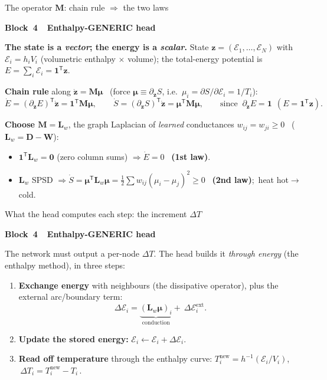 \documentclass[aspectratio=169,11pt]{beamer}
\newcommand{\T}{\mathsf{T}}
\newcommand{\Lw}{\bm{L}_{\!w}}
\newcommand{\bmu}{\bm{\mu}}
\newcommand{\blocktag}[3]{\par\vspace{-3.5mm}\hfill
  {\footnotesize\setlength{\fboxsep}{2.2pt}%
   \colorbox{#1!16}{\textcolor{#1!60!black}{\textbf{Block~#2~\textbullet~#3}}}}%
  \par\vspace{0.3mm}}
\begin{document}
\begin{frame}{The operator $\bm M$: chain rule $\Rightarrow$ the two laws}
  \blocktag{orange!80!black}{4}{Enthalpy-GENERIC head}
  \textbf{The state is a \emph{vector}; the energy is a \emph{scalar}.}
  State $\bm z=(\mathcal E_1,\dots,\mathcal E_N)$ with
  $\mathcal E_i=h_iV_i$ (volumetric enthalpy $\times$ volume); the total-energy
  potential is $E=\sum_i\mathcal E_i=\bm 1^\T\bm z$.
  \medskip\pause

  \textbf{Chain rule} along $\dot{\bm z}=\bm M\bmu$ \ (force
  $\bmu\equiv\partial_{\bm z}S$, i.e.\ $\mu_i=\partial S/\partial\mathcal E_i=1/T_i$):
  \begin{equation*}
    \dot E=(\partial_{\bm z}E)^\T\dot{\bm z}=\bm 1^\T\bm M\bmu,
    \qquad
    \dot S=(\partial_{\bm z}S)^\T\dot{\bm z}=\bmu^\T\bm M\bmu,
    \qquad \text{since }\ \partial_{\bm z}E=\bm 1\ \ (E=\bm 1^\T\bm z).
  \end{equation*}
  \pause

  \textbf{Choose $\bm M=\Lw$}, the graph Laplacian of \emph{learned} conductances
  $w_{ij}=w_{ji}\ge0$ \ ($\Lw=\bm D-\bm W$):
  \begin{itemize}\itemsep1pt
    \item $\bm 1^\T\Lw=\bm 0$ (zero column sums) $\Rightarrow \dot E=0$
      \ \textbf{(1st law)}.
    \item $\Lw$ SPSD $\Rightarrow \dot S=\bmu^\T\Lw\bmu
      =\tfrac12\sum w_{ij}(\mu_i{-}\mu_j)^2\ge0$ \ \textbf{(2nd law)};\ heat
      hot$\to$cold.
  \end{itemize}
\end{frame}

\begin{frame}{What the head computes each step: the increment $\Delta T$}
  \blocktag{orange!80!black}{4}{Enthalpy-GENERIC head}
  The network must output a per-node $\Delta T$. The head builds it \emph{through
  energy} (the enthalpy method), in three steps:
  \medskip\pause

  \begin{enumerate}\itemsep3pt
    \item \textbf{Exchange energy} with neighbours (the dissipative operator),
      plus the external arc/boundary term:
      \[ \Delta\mathcal E_i=\underbrace{(\Lw\bmu)_i}_{\text{conduction}}
         +\ \Delta\mathcal E_i^{\mathrm{ext}}. \]
    \item<3-> \textbf{Update the stored energy:}\quad
      $\mathcal E_i \leftarrow \mathcal E_i+\Delta\mathcal E_i$.
    \item<4-> \textbf{Read off temperature} through the enthalpy curve:\quad
      $T_i^{\text{new}}=h^{-1}(\mathcal E_i/V_i)$,\quad
      $\boxed{\,\Delta T_i=T_i^{\text{new}}-T_i\,}$.
  \end{enumerate}
  \medskip
\end{frame}
\end{document}
